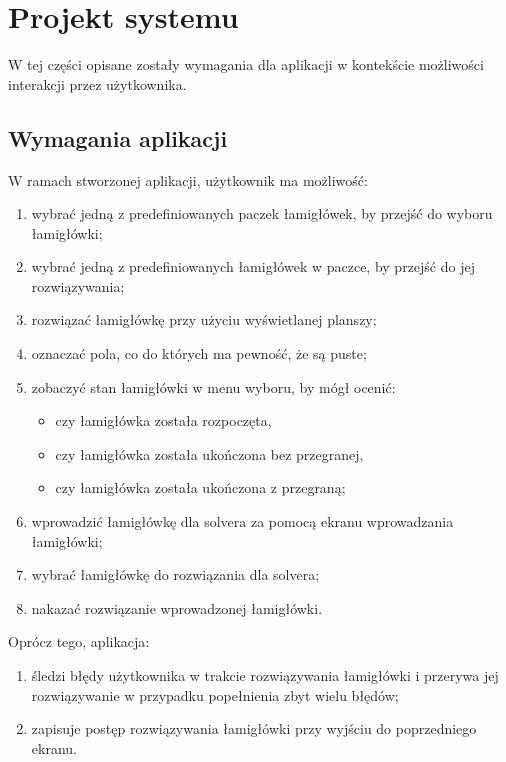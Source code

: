 \chapter{Projekt systemu}
\thispagestyle{chapterBeginStyle}

    W tej części opisane zostały wymagania dla aplikacji w kontekście możliwości interakcji przez
użytkownika.



\section{Wymagania aplikacji}
    W ramach stworzonej aplikacji, użytkownik ma możliwość:
\begin{enumerate}
    \item wybrać jedną z predefiniowanych paczek łamigłówek, by przejść do wyboru łamigłówki;
    \item wybrać jedną z predefiniowanych łamigłówek w paczce, by przejść do jej rozwiązywania;
    \item rozwiązać łamigłówkę przy użyciu wyświetlanej planszy;
    \item oznaczać pola, co do których ma pewność, że są puste;
    \item zobaczyć stan łamigłówki w menu wyboru, by mógł ocenić:
    \begin{itemize}
        \item czy łamigłówka została rozpoczęta,
        \item czy łamigłówka została ukończona bez przegranej,
        \item czy łamigłówka została ukończona z przegraną;
    \end{itemize}
    \item wprowadzić łamigłówkę dla solvera za pomocą ekranu wprowadzania łamigłówki;
    \item wybrać łamigłówkę do rozwiązania dla solvera;
    \item nakazać rozwiązanie wprowadzonej łamigłówki.
\end{enumerate}

    Oprócz tego, aplikacja:
\begin{enumerate}
    \item śledzi błędy użytkownika w trakcie rozwiązywania łamigłówki i przerywa jej rozwiązywanie
w przypadku popełnienia zbyt wielu błędów;
    \item zapisuje postęp rozwiązywania łamigłówki przy wyjściu do poprzedniego ekranu.
\end{enumerate}



